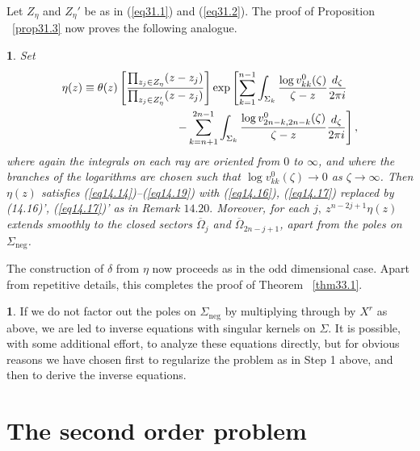 \documentclass{surv-l}
\theoremstyle{plain}
\newtheorem{prop}[theorem]{\sc{Proposition}}
\theoremstyle{definition}
\newtheorem{remark}[theorem]{\sc{Remark}}
\numberwithin{equation}{chapter}
\begin{document}
Let $Z_{\eta}$ and $Z_{\eta}'$ be as in (\ref{eq31.1}) and (\ref{eq31.2}). The proof of Proposition ~\ref{prop31.3} now proves the following analogue.
\setcounter{theorem}{26}
\begin{prop}\label{prop33.27}
Set
\setcounter{equation}{27}
\begin{align}\label{eq33.28}
&\eta(z)\equiv\theta(z)\left[\frac{\prod_{z_{j}\in Z_{\eta}}(z-z_{j})}{\prod_{z_{j}\in Z_{\eta}'}(z-z_{j})}\right]\exp\left[\sum_{k=1}^{n-1}\int_{\Sigma_{k}}\frac{\log v_{kk}^{0}(\zeta)}{\zeta-z}\frac{d_{\zeta}}{2\pi i}\right.\\
&\qquad\qquad\qquad\qquad\qquad\left.-\sum_{k=n+1}^{2n-1}\int_{\Sigma_{k}}\frac{\log v_{2n-k,2n-k}^{0}(\zeta)}{\zeta-z}\frac{d_{\zeta}}{2\pi i}\right], \notag
\end{align}
where again the integrals on each ray are oriented from $0$ to
$\infty$, and where the branches of the logarithms are chosen such
that $\log v_{kk}^{0}(\zeta)\rightarrow 0$ as
$\zeta\rightarrow\infty$. Then $\eta(z)$ satisfies \emph{(\ref{eq14.14})}--\emph{(\ref{eq14.19})} with \emph{(\ref{eq14.16})}, \emph{(\ref{eq14.17})} replaced by \emph{(14.16)'}, \emph{(\ref{eq14.17})'}  as in Remark $14.20.$ Moreover, for each $j,\ z^{n-2j+1}\eta(z)$ extends smoothly to the closed sectors $\overline{\Omega}_{j}$ and $\overline{\Omega}_{2n-j+1}$, apart from the poles on $\Sigma_{\mathrm{neg}}$.
\end{prop}

The construction of $\delta$ from $\eta$ now proceeds as in the odd dimensional case. Apart from repetitive details, this completes the proof of Theorem ~\ref{thm33.1}.
\setcounter{theorem}{28}
\begin{remark}\label{rem33.29}
If we do not factor out the poles on $\Sigma_{\mathrm{neg}}$ by multiplying through by $X^{r}$ as above, we are led to inverse equations with singular kernels on $\Sigma$. It is possible, with some additional effort, to analyze these equations directly, but for obvious reasons we have chosen first to regularize the problem as in Step 1 above, and then to derive the inverse equations.
\end{remark}

\section{The second order problem}\label{sec34}
\end{document}
